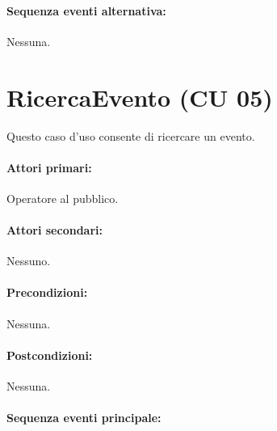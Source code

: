 \documentclass{article}
\begin{document}
    \paragraph{Sequenza eventi alternativa:} Nessuna.    
    



\newpage

		\section*{RicercaEvento (CU 05)}
	
	\indent\indent Questo caso d'uso consente di ricercare un evento. 
	
	\paragraph{Attori primari:}Operatore al pubblico.
	
	\paragraph{Attori secondari:}Nessuno.
	
	\paragraph{Precondizioni:}Nessuna.
	
	\paragraph{Postcondizioni:}Nessuna.
	
	\paragraph{Sequenza eventi principale:}
\end{document}
